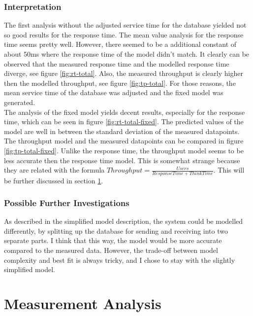 \documentclass[a4paper]{article}
\begin{document}
{\begin{landscape}
\end{landscape}



\subsubsection{Interpretation}

The first analysis without the adjusted service time for the database yielded not so good results for the response time. The mean value analysis for the response time seems pretty well. However, there seemed to be a additional constant of about 50ms where the response time of the model didn't match. It clearly can be observed that the measured response time and the modelled response time diverge, see figure \ref{fig:rt-total}. Also, the measured throughput is clearly higher then the modelled throughput, see figure \ref{fig:tp-total}. For those reasons, the mean service time of the database was adjusted and the fixed model was generated.\\

The analysis of the fixed model yields decent results, especially for the response time, which can be seen in figure \ref{fig:rt-total-fixed}. The predicted values of the model are well in between the standard deviation of the measured datapoints.\\

The throughput model and the measured datapoints can be compared in figure \ref{fig:tp-total-fixed}. Unlike the response time, the throughput model seems to be less accurate then the response time model. This is somewhat strange because they are related with the formula $Throughput=\frac{Users}{ResponseTime + ThinkTime}$. This will be further discussed in section \ref{sec:measurement-analysis}.


\subsubsection{Possible Further Investigations}

As described in the simplified model description, the system could be modelled differently, by splitting up the database for sending and receiving into two separate parts. I think that this way, the model would be more accurate compared to the measured data. However, the trade-off between model complexity and best fit is always tricky, and I chose to stay with the slightly simplified model.



\section{Measurement Analysis}
\label{sec:measurement-analysis}

}
\end{document}
